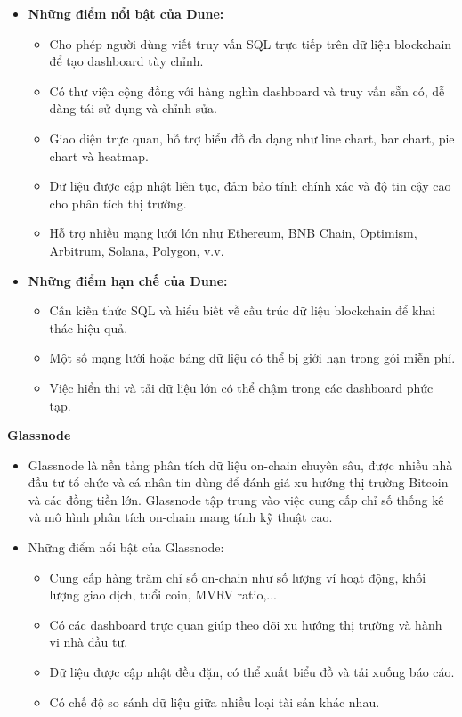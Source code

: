 \documentclass{article}[14pt]
\begin{document}
{\begin{itemize}
        \item \textbf{Những điểm nổi bật của Dune:}
        \begin{itemize}
            \item Cho phép người dùng viết truy vấn SQL trực tiếp trên dữ liệu blockchain để tạo dashboard tùy chỉnh.
            \item Có thư viện cộng đồng với hàng nghìn dashboard và truy vấn sẵn có, dễ dàng tái sử dụng và chỉnh sửa.
            \item Giao diện trực quan, hỗ trợ biểu đồ đa dạng như line chart, bar chart, pie chart và heatmap.
            \item Dữ liệu được cập nhật liên tục, đảm bảo tính chính xác và độ tin cậy cao cho phân tích thị trường.
            \item Hỗ trợ nhiều mạng lưới lớn như Ethereum, BNB Chain, Optimism, Arbitrum, Solana, Polygon, v.v.
        \end{itemize}
    \end{itemize}
    
    \begin{itemize}
        \item \textbf{Những điểm hạn chế của Dune:}
        \begin{itemize}
            \item Cần kiến thức SQL và hiểu biết về cấu trúc dữ liệu blockchain để khai thác hiệu quả.
            \item Một số mạng lưới hoặc bảng dữ liệu có thể bị giới hạn trong gói miễn phí.
            \item Việc hiển thị và tải dữ liệu lớn có thể chậm trong các dashboard phức tạp.
        \end{itemize}
    \end{itemize}

    \textbf{Glassnode} \cite{glassnode}
    
    \begin{itemize}
        \item Glassnode là nền tảng phân tích dữ liệu on-chain chuyên sâu, được nhiều nhà đầu tư tổ chức và cá nhân tin dùng để đánh giá xu hướng thị trường Bitcoin và các đồng tiền lớn. Glassnode tập trung vào việc cung cấp chỉ số thống kê và mô hình phân tích on-chain mang tính kỹ thuật cao.

        \item Những điểm nổi bật của Glassnode:
        \begin{itemize}
            \item Cung cấp hàng trăm chỉ số on-chain như số lượng ví hoạt động, khối lượng giao dịch, tuổi coin, MVRV ratio,...
            \item Có các dashboard trực quan giúp theo dõi xu hướng thị trường và hành vi nhà đầu tư.
            \item Dữ liệu được cập nhật đều đặn, có thể xuất biểu đồ và tải xuống báo cáo.
            \item Có chế độ so sánh dữ liệu giữa nhiều loại tài sản khác nhau.
        \end{itemize}
    \end{itemize}

}
\end{document}
